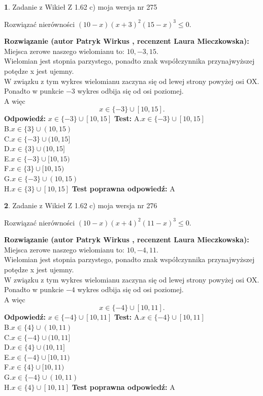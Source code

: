 \documentclass[12pt, a4paper]{article}
\theoremstyle{definition} %
\newtheorem{zad}{}
\newcommand{\zadStart}[1]{\begin{zad}#1\newline}
\newcommand{\zadStop}{\end{zad}}
\newcommand{\rozwStart}[2]{\noindent \textbf{Rozwiązanie (autor #1 , recenzent #2): }\newline}
\newcommand{\rozwStop}{\newline}
\newcommand{\odpStart}{\noindent \textbf{Odpowiedź:}\newline}
\newcommand{\odpStop}{\newline}
\newcommand{\testStart}{\noindent \textbf{Test:}\newline}
\newcommand{\testStop}{\newline}
\newcommand{\kluczStart}{\noindent \textbf{Test poprawna odpowiedź:}\newline}
\newcommand{\kluczStop}{\newline}
\begin{document}
\zadStart{Zadanie z Wikieł Z 1.62 c) moja wersja nr 275}

Rozwiązać nierówności $(10-x)(x+3)^{2}(15-x)^{3}\le0$.
\zadStop
\rozwStart{Patryk Wirkus}{Laura Mieczkowska}
Miejsca zerowe naszego wielomianu to: $10, -3, 15$.\\
Wielomian jest stopnia parzystego, ponadto znak współczynnika przy\linebreak najwyższej potędze x jest ujemny.\\ W związku z tym wykres wielomianu zaczyna się od lewej strony powyżej osi OX.\\
Ponadto w punkcie $-3$ wykres odbija się od osi poziomej.\\
A więc $$x \in \{-3\} \cup [10,15].$$
\rozwStop
\odpStart
$x \in \{-3\} \cup [10,15]$
\odpStop
\testStart
A.$x \in \{-3\} \cup [10,15]$\\
B.$x \in \{3\} \cup (10,15)$\\
C.$x \in \{-3\} \cup (10,15]$\\
D.$x \in \{3\} \cup (10,15]$\\
E.$x \in \{-3\} \cup [10,15)$\\
F.$x \in \{3\} \cup [10,15)$\\
G.$x \in \{-3\} \cup (10,15)$\\
H.$x \in \{3\} \cup [10,15]$
\testStop
\kluczStart
A
\kluczStop



\zadStart{Zadanie z Wikieł Z 1.62 c) moja wersja nr 276}

Rozwiązać nierówności $(10-x)(x+4)^{2}(11-x)^{3}\le0$.
\zadStop
\rozwStart{Patryk Wirkus}{Laura Mieczkowska}
Miejsca zerowe naszego wielomianu to: $10, -4, 11$.\\
Wielomian jest stopnia parzystego, ponadto znak współczynnika przy\linebreak najwyższej potędze x jest ujemny.\\ W związku z tym wykres wielomianu zaczyna się od lewej strony powyżej osi OX.\\
Ponadto w punkcie $-4$ wykres odbija się od osi poziomej.\\
A więc $$x \in \{-4\} \cup [10,11].$$
\rozwStop
\odpStart
$x \in \{-4\} \cup [10,11]$
\odpStop
\testStart
A.$x \in \{-4\} \cup [10,11]$\\
B.$x \in \{4\} \cup (10,11)$\\
C.$x \in \{-4\} \cup (10,11]$\\
D.$x \in \{4\} \cup (10,11]$\\
E.$x \in \{-4\} \cup [10,11)$\\
F.$x \in \{4\} \cup [10,11)$\\
G.$x \in \{-4\} \cup (10,11)$\\
H.$x \in \{4\} \cup [10,11]$
\testStop
\kluczStart
A
\kluczStop
\end{document}
